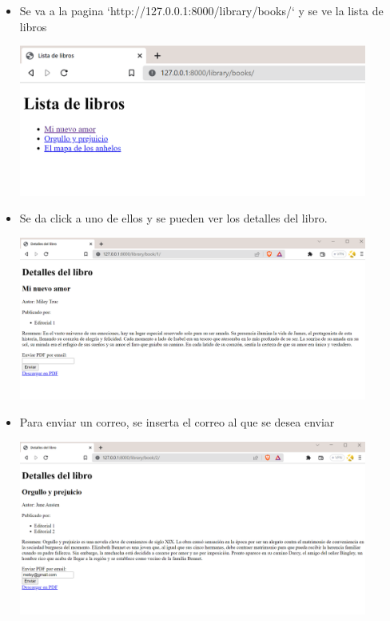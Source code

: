 \documentclass{article}
\begin{document}
\begin{itemize}

\item Se va a la pagina `http://127.0.0.1:8000/library/books/` y se ve la lista de libros

\begin{minipage}{\linewidth}
    \centering
    \includegraphics[width=0.90\textwidth]{imagenes/img5.png}
\end{minipage}
\vspace{\baselineskip}

\item Se da click a uno de ellos y se pueden ver los detalles del libro.

\begin{minipage}{\linewidth}
    \centering
    \includegraphics[width=0.90\textwidth]{imagenes/img6.png}
\end{minipage}
\vspace{\baselineskip}

\item Para enviar un correo, se inserta el correo al que se desea enviar

\begin{minipage}{\linewidth}
    \centering
    \includegraphics[width=0.90\textwidth]{imagenes/img7.png}
\end{minipage}
\vspace{\baselineskip}


\end{itemize}
\end{document}
